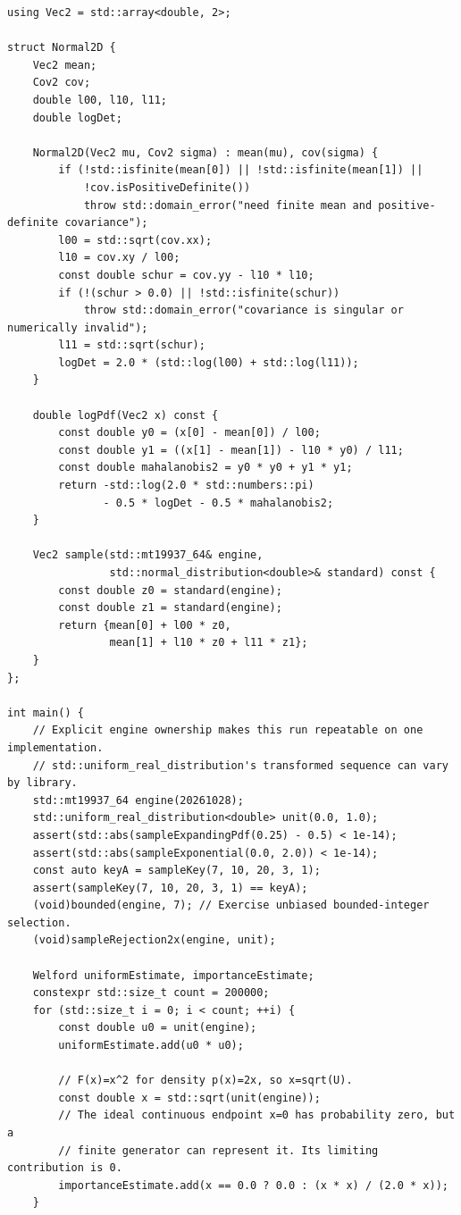 \begin{verbatim}
using Vec2 = std::array<double, 2>;

struct Normal2D {
    Vec2 mean;
    Cov2 cov;
    double l00, l10, l11;
    double logDet;

    Normal2D(Vec2 mu, Cov2 sigma) : mean(mu), cov(sigma) {
        if (!std::isfinite(mean[0]) || !std::isfinite(mean[1]) ||
            !cov.isPositiveDefinite())
            throw std::domain_error("need finite mean and positive-definite covariance");
        l00 = std::sqrt(cov.xx);
        l10 = cov.xy / l00;
        const double schur = cov.yy - l10 * l10;
        if (!(schur > 0.0) || !std::isfinite(schur))
            throw std::domain_error("covariance is singular or numerically invalid");
        l11 = std::sqrt(schur);
        logDet = 2.0 * (std::log(l00) + std::log(l11));
    }

    double logPdf(Vec2 x) const {
        const double y0 = (x[0] - mean[0]) / l00;
        const double y1 = ((x[1] - mean[1]) - l10 * y0) / l11;
        const double mahalanobis2 = y0 * y0 + y1 * y1;
        return -std::log(2.0 * std::numbers::pi)
               - 0.5 * logDet - 0.5 * mahalanobis2;
    }

    Vec2 sample(std::mt19937_64& engine,
                std::normal_distribution<double>& standard) const {
        const double z0 = standard(engine);
        const double z1 = standard(engine);
        return {mean[0] + l00 * z0,
                mean[1] + l10 * z0 + l11 * z1};
    }
};

int main() {
    // Explicit engine ownership makes this run repeatable on one implementation.
    // std::uniform_real_distribution's transformed sequence can vary by library.
    std::mt19937_64 engine(20261028);
    std::uniform_real_distribution<double> unit(0.0, 1.0);
    assert(std::abs(sampleExpandingPdf(0.25) - 0.5) < 1e-14);
    assert(std::abs(sampleExponential(0.0, 2.0)) < 1e-14);
    const auto keyA = sampleKey(7, 10, 20, 3, 1);
    assert(sampleKey(7, 10, 20, 3, 1) == keyA);
    (void)bounded(engine, 7); // Exercise unbiased bounded-integer selection.
    (void)sampleRejection2x(engine, unit);

    Welford uniformEstimate, importanceEstimate;
    constexpr std::size_t count = 200000;
    for (std::size_t i = 0; i < count; ++i) {
        const double u0 = unit(engine);
        uniformEstimate.add(u0 * u0);

        // F(x)=x^2 for density p(x)=2x, so x=sqrt(U).
        const double x = std::sqrt(unit(engine));
        // The ideal continuous endpoint x=0 has probability zero, but a
        // finite generator can represent it. Its limiting contribution is 0.
        importanceEstimate.add(x == 0.0 ? 0.0 : (x * x) / (2.0 * x));
    }


\end{verbatim}
